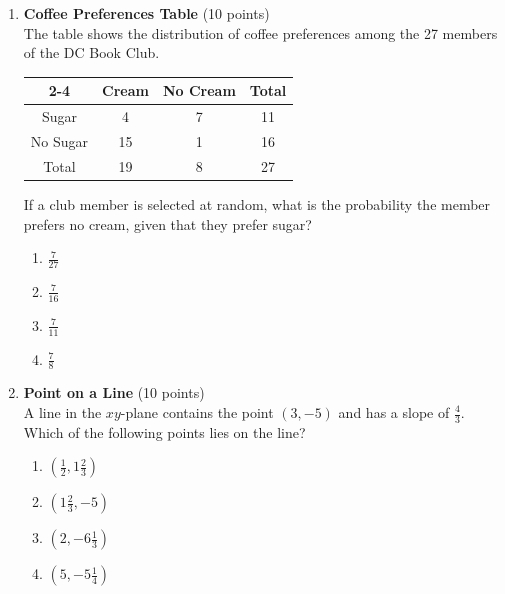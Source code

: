 \begin{enumerate}
  \item \textbf{Coffee Preferences Table} (10 points)\\
  The table shows the distribution of coffee preferences among the 27 members of the DC Book Club.
  \begin{table}[h!]
  \centering
  \renewcommand{\arraystretch}{1.3}
  \setlength{\tabcolsep}{12pt}
  \begin{tabular}{|c|c|c|c|}
    \cline{2-4} \multicolumn{1}{c|}{} & Cream & No Cream & Total \\
    \hline Sugar & 4 & 7 & 11 \\
    \hline No Sugar & 15 & 1 & 16 \\
    \hline Total & 19 & 8 & 27 \\
    \hline
  \end{tabular}
  \end{table}
  If a club member is selected at random, what is the probability the member prefers no cream, given that they prefer sugar?
  \begin{enumerate}[label=\Alph*.]
    \item $\frac{7}{27}$
    \item $\frac{7}{16}$
    \item $\frac{7}{11}$
    \item $\frac{7}{8}$
  \end{enumerate}
  \begin{subanswer}
  \end{subanswer}

  \item \textbf{Point on a Line} (10 points)\\
  A line in the $xy$-plane contains the point $(3, -5)$ and has a slope of $\frac{4}{3}$. Which of the following points lies on the line?
  \begin{enumerate}[label=\Alph*.]
    \item $\left(\frac{1}{2}, 1 \frac{2}{3}\right)$
    \item $\left(1 \frac{2}{3}, -5\right)$
    \item $\left(2, -6 \frac{1}{3}\right)$
    \item $\left(5, -5 \frac{1}{4}\right)$
  \end{enumerate}
  \begin{subanswer}
  \end{subanswer}


\end{enumerate}
